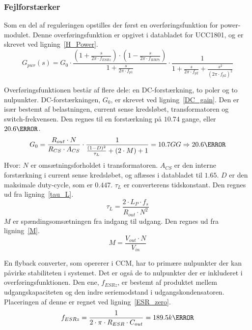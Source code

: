 \subsubsection{Fejlforstærker}
Som en del af reguleringen opstilles der først en overføringsfunktion for power-modulet. Denne overføringsfunktion er opgivet i databladet for UCC1801, og er skrevet ved ligning~\ref{H_Power}.
\begin{equation} \label{H_Power}
G_{pwr}(s) = G_0 \cdot \frac{(1+\frac{s}{2\pi \cdot f_{ESRz}}) \cdot (1-\frac{s}{2\pi \cdot f_{RHPz}})}{1+\frac{s}{2\pi \cdot f_{p1}}} \cdot \frac{1}{1 + \frac{s}{2\pi \cdot f_{p2}} + \frac{s^2}{(2\pi \cdot f_{p2})^2}}
\end{equation}

Overføringsfunktionen består af flere dele: en DC-forstærkning, to poler og to nulpunkter. DC-forstærkningen, $G_0$, er skrevet ved ligning~\ref{DC_gain}. Den er især bestemt af belastningen, current sense kredsløbet, transformatoren og switch-frekvensen. Den regnes til en forstærkning på $10.74$ gange, eller $20.6\decibel$.
\begin{equation} \label{DC_gain}
G_0 = \frac{R_{out} \cdot N}{R_{CS} \cdot A_{CS}} \cdot \frac{1}{\frac{(1-D)^2}{\tau_L} + (2 \cdot M) + 1} = 10.7GG \Rightarrow 20.6\decibel
\end{equation}
\noindent Hvor:
\newline \noindent $N$ er omsætningsforholdet i transformatoren.
\newline \noindent $A_{CS}$ er den interne forstærkning i current sense kredsløbet, og aflæses i databladet til $1.65$.
\newline \noindent $D$ er den maksimale duty-cycle, som er $0.447$.
\newline \noindent $\tau_L$ er converterens tidskonstant. Den regnes ud fra ligning~\ref{tau_L}.
\begin{equation} \label{tau_L}
\tau_L = \frac{2 \cdot L_P \cdot f_s}{R_{out} \cdot N^2}
\end{equation}
\newline \noindent $M$ er spændingsomsætningen fra indgang til udgang. Den regnes ud fra ligning~\ref{M}.
\begin{equation} \label{M}
M = \frac{V_{out} \cdot N}{V_{in}}
\end{equation}

En flyback converter, som opererer i CCM, har to primære nulpunkter der kan påvirke stabiliteten i systemet. Det er også de to nulpunkter der er inkluderet i overføringsfunktionen. Den ene, $f_{ESRz}$, er bestemt af produktet mellem udgangskapaciteten og den indre seriemodstand i udgangskondensatoren. Placeringen af denne er regnet ved ligning~\ref{ESR_zero}.
\begin{equation} \label{ESR_zero}
f_{ESRz} = \frac{1}{2 \cdot \pi \cdot R_{ESR} \cdot C_{out}} = 189.5k\hertz
\end{equation}

